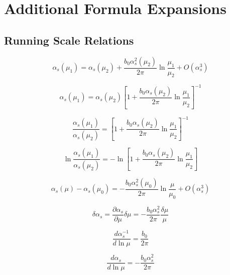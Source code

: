 \documentclass[11pt,a4paper]{article}
\theoremstyle{definition}
\begin{document}
\section{Additional Formula Expansions}
\label{app:add-formulas}

\subsection{Running Scale Relations}
\label{subsec:add-running}

\begin{equation}
\label{eq:add-1}
\alpha_s(\mu_1) = \alpha_s(\mu_2) + \frac{b_0\alpha_s^2(\mu_2)}{2\pi}\ln\frac{\mu_1}{\mu_2} + O(\alpha_s^3)
\end{equation}

\begin{equation}
\label{eq:add-2}
\alpha_s(\mu_1) = \alpha_s(\mu_2)\left[1 + \frac{b_0\alpha_s(\mu_2)}{2\pi}\ln\frac{\mu_1}{\mu_2}\right]^{-1}
\end{equation}

\begin{equation}
\label{eq:add-3}
\frac{\alpha_s(\mu_1)}{\alpha_s(\mu_2)} = \left[1 + \frac{b_0\alpha_s(\mu_2)}{2\pi}\ln\frac{\mu_1}{\mu_2}\right]^{-1}
\end{equation}

\begin{equation}
\label{eq:add-4}
\ln\frac{\alpha_s(\mu_1)}{\alpha_s(\mu_2)} = -\ln\left[1 + \frac{b_0\alpha_s(\mu_2)}{2\pi}\ln\frac{\mu_1}{\mu_2}\right]
\end{equation}

\begin{equation}
\label{eq:add-5}
\alpha_s(\mu) - \alpha_s(\mu_0) = -\frac{b_0\alpha_s^2(\mu_0)}{2\pi}\ln\frac{\mu}{\mu_0} + O(\alpha_s^3)
\end{equation}

\begin{equation}
\label{eq:add-6}
\delta\alpha_s = \frac{\partial\alpha_s}{\partial\mu}\delta\mu = -\frac{b_0\alpha_s^2}{2\pi}\frac{\delta\mu}{\mu}
\end{equation}

\begin{equation}
\label{eq:add-7}
\frac{d\alpha_s^{-1}}{d\ln\mu} = \frac{b_0}{2\pi}
\end{equation}

\begin{equation}
\label{eq:add-8}
\frac{d\alpha_s}{d\ln\mu} = -\frac{b_0\alpha_s^2}{2\pi}
\end{equation}
\end{document}
